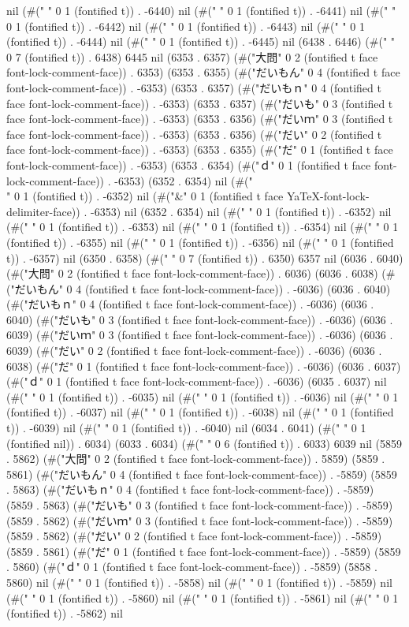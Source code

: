 nil (#(" " 0 1 (fontified t)) . -6440) nil (#(" " 0 1 (fontified t)) . -6441) nil (#(" " 0 1 (fontified t)) . -6442) nil (#(" " 0 1 (fontified t)) . -6443) nil (#(" " 0 1 (fontified t)) . -6444) nil (#(" " 0 1 (fontified t)) . -6445) nil (6438 . 6446) (#("       " 0 7 (fontified t)) . 6438) 6445 nil (6353 . 6357) (#("大問" 0 2 (fontified t face font-lock-comment-face)) . 6353) (6353 . 6355) (#("だいもん" 0 4 (fontified t face font-lock-comment-face)) . -6353) (6353 . 6357) (#("だいもｎ" 0 4 (fontified t face font-lock-comment-face)) . -6353) (6353 . 6357) (#("だいも" 0 3 (fontified t face font-lock-comment-face)) . -6353) (6353 . 6356) (#("だいｍ" 0 3 (fontified t face font-lock-comment-face)) . -6353) (6353 . 6356) (#("だい" 0 2 (fontified t face font-lock-comment-face)) . -6353) (6353 . 6355) (#("だ" 0 1 (fontified t face font-lock-comment-face)) . -6353) (6353 . 6354) (#("ｄ" 0 1 (fontified t face font-lock-comment-face)) . -6353) (6352 . 6354) nil (#("\\" 0 1 (fontified t)) . -6352) nil (#("&" 0 1 (fontified t face YaTeX-font-lock-delimiter-face)) . -6353) nil (6352 . 6354) nil (#(" " 0 1 (fontified t)) . -6352) nil (#(" " 0 1 (fontified t)) . -6353) nil (#(" " 0 1 (fontified t)) . -6354) nil (#(" " 0 1 (fontified t)) . -6355) nil (#(" " 0 1 (fontified t)) . -6356) nil (#(" " 0 1 (fontified t)) . -6357) nil (6350 . 6358) (#("       " 0 7 (fontified t)) . 6350) 6357 nil (6036 . 6040) (#("大問" 0 2 (fontified t face font-lock-comment-face)) . 6036) (6036 . 6038) (#("だいもん" 0 4 (fontified t face font-lock-comment-face)) . -6036) (6036 . 6040) (#("だいもｎ" 0 4 (fontified t face font-lock-comment-face)) . -6036) (6036 . 6040) (#("だいも" 0 3 (fontified t face font-lock-comment-face)) . -6036) (6036 . 6039) (#("だいｍ" 0 3 (fontified t face font-lock-comment-face)) . -6036) (6036 . 6039) (#("だい" 0 2 (fontified t face font-lock-comment-face)) . -6036) (6036 . 6038) (#("だ" 0 1 (fontified t face font-lock-comment-face)) . -6036) (6036 . 6037) (#("ｄ" 0 1 (fontified t face font-lock-comment-face)) . -6036) (6035 . 6037) nil (#(" " 0 1 (fontified t)) . -6035) nil (#(" " 0 1 (fontified t)) . -6036) nil (#(" " 0 1 (fontified t)) . -6037) nil (#(" " 0 1 (fontified t)) . -6038) nil (#(" " 0 1 (fontified t)) . -6039) nil (#(" " 0 1 (fontified t)) . -6040) nil (6034 . 6041) (#(" " 0 1 (fontified nil)) . 6034) (6033 . 6034) (#("      " 0 6 (fontified t)) . 6033) 6039 nil (5859 . 5862) (#("大問" 0 2 (fontified t face font-lock-comment-face)) . 5859) (5859 . 5861) (#("だいもん" 0 4 (fontified t face font-lock-comment-face)) . -5859) (5859 . 5863) (#("だいもｎ" 0 4 (fontified t face font-lock-comment-face)) . -5859) (5859 . 5863) (#("だいも" 0 3 (fontified t face font-lock-comment-face)) . -5859) (5859 . 5862) (#("だいｍ" 0 3 (fontified t face font-lock-comment-face)) . -5859) (5859 . 5862) (#("だい" 0 2 (fontified t face font-lock-comment-face)) . -5859) (5859 . 5861) (#("だ" 0 1 (fontified t face font-lock-comment-face)) . -5859) (5859 . 5860) (#("ｄ" 0 1 (fontified t face font-lock-comment-face)) . -5859) (5858 . 5860) nil (#(" " 0 1 (fontified t)) . -5858) nil (#(" " 0 1 (fontified t)) . -5859) nil (#(" " 0 1 (fontified t)) . -5860) nil (#(" " 0 1 (fontified t)) . -5861) nil (#(" " 0 1 (fontified t)) . -5862) nil 